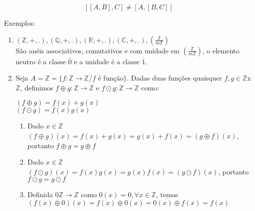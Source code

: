 \[[[A,B],C]\neq [A,[B,C]]\]





Exemplos:
\begin{enumerate}
\item $(\mathbb{Z},+,.),(\mathbb{Q},+,.),(\mathbb{R},+,.),(\mathbb{C},+,.),\left(\displaystyle\frac{\mathbb{Z}}{m\mathbb{Z}}\right)$\\
S{\~a}o an{\'e}is associativos, comutativos e com unidade em $\left(\displaystyle\frac{\mathbb{Z}}{m\mathbb{Z}}\right)$, o elemento neutro {\'e} a classe $\bar{0}$ e a unidade {\'e} a classe $\bar{1}$.
\item  Seja $A=\mathbb{Z}=\{f:\mathbb{Z}\rightarrow\mathbb{Z}/f$ {\'e} fun{\c c}{\~a}o$\}$. Dadas duas fun{\c c}{\~o}es quaisquer $f,g\in\mathbb{Z}$x$\mathbb{Z}$, definimos $f\oplus g:\mathbb{Z}\rightarrow\mathbb{Z}$ e $f\odot g:\mathbb{Z}\rightarrow\mathbb{Z}$ como:


$(f\oplus g)=f(x)+g(x)$\\
$(f\odot g)=f(x)g(x)$
\begin{enumerate}
\item Dado $x\in\mathbb{Z}$\\
$(f\oplus g)(x)=f(x)+g(x)=g(x)+f(x)=(g\oplus f)(x)$, portanto $f\oplus g=g\oplus f$
\item Dado $x\in\mathbb{Z}$\\
$(f\odot g)(x)=f(x)g(x)=g(x)f(x)=(g\odot f)(x)$, portanto $f\odot g=g\odot f$
\item Definida $0\mathbb{Z}\rightarrow\mathbb{Z}$ como $0(x)=0,\forall x\in\mathbb{Z}$, temos\\
$(f(x)\oplus 0)(x)=f(x)\oplus 0(x)=0(x)\oplus f(x)=f(x)$

\end{enumerate}
\end{enumerate}

